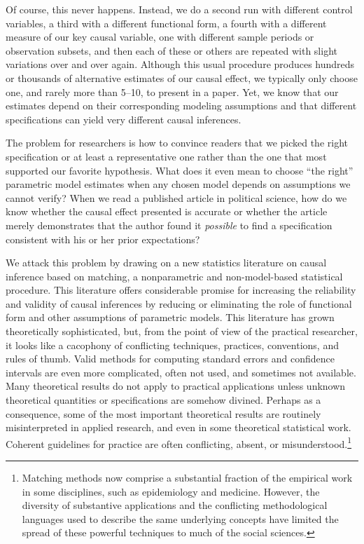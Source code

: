 \documentclass[11pt,titlepage]{article}
\begin{document}
Of course, this never happens.  Instead, we do a second run with
different control variables, a third with a different functional form,
a fourth with a different measure of our key causal variable, one with
different sample periods or observation subsets, and then each of
these or others are repeated with slight variations over and over
again.  Although this usual procedure produces hundreds or thousands
of alternative estimates of our causal effect, we typically only
choose one, and rarely more than 5--10, to present in a paper.  Yet,
we know that our estimates depend on their corresponding modeling
assumptions and that different specifications can yield very different
causal inferences.

The problem for researchers is how to convince readers that we picked
the right specification or at least a representative one rather than
the one that most supported our favorite hypothesis.  What does it
even mean to choose ``the right'' parametric model estimates when any
chosen model depends on assumptions we cannot verify?  When we read a
published article in political science, how do we know whether the
causal effect presented is accurate or whether the article merely
demonstrates that the author found it \emph{possible} to find a
specification consistent with his or her prior expectations?

We attack this problem by drawing on a new statistics literature on
causal inference based on matching, a nonparametric and
non-model-based statistical procedure.  This literature offers
considerable promise for increasing the reliability and validity of
causal inferences by reducing or eliminating the role of functional
form and other assumptions of parametric models.  This literature has
grown theoretically sophisticated, but, from the point of view of the
practical researcher, it looks like a cacophony of conflicting
techniques, practices, conventions, and rules of thumb.  Valid methods
for computing standard errors and confidence intervals are even more
complicated, often not used, and sometimes not available.  Many
theoretical results do not apply to practical applications unless
unknown theoretical quantities or specifications are somehow divined.
Perhaps as a consequence, some of the most important theoretical
results are routinely misinterpreted in applied research, and even in
some theoretical statistical work.  Coherent guidelines for practice
are often conflicting, absent, or misunderstood.\footnote{Matching
  methods now comprise a substantial fraction of the empirical work in
  some disciplines, such as epidemiology and medicine.  However, the
  diversity of substantive applications and the conflicting
  methodological languages used to describe the same underlying
  concepts have limited the spread of these powerful techniques to
  much of the social sciences.}
\end{document}
